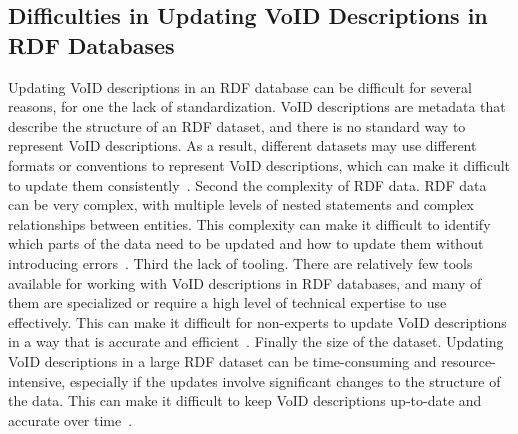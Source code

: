 \subsection{Difficulties in Updating VoID Descriptions in RDF Databases} \label{sec:difficulties-void}
Updating VoID descriptions in an RDF database can be difficult for several reasons, for one the lack of standardization. VoID descriptions are metadata that describe the structure of an RDF dataset, and there is no standard way to represent VoID descriptions. As a result, different datasets may use different formats or conventions to represent VoID descriptions, which can make it difficult to update them consistently~\cite{documentation-void}. Second the complexity of RDF data. RDF data can be very complex, with multiple levels of nested statements and complex relationships between entities. This complexity can make it difficult to identify which parts of the data need to be updated and how to update them without introducing errors~\cite{the-web-of-data}. Third the lack of tooling. There are relatively few tools available for working with VoID descriptions in RDF databases, and many of them are specialized or require a high level of technical expertise to use effectively. This can make it difficult for non-experts to update VoID descriptions in a way that is accurate and efficient~\cite{mendes2019voidext}. Finally the size of the dataset. Updating VoID descriptions in a large RDF dataset can be time-consuming and resource-intensive, especially if the updates involve significant changes to the structure of the data. This can make it difficult to keep VoID descriptions up-to-date and accurate over time~\cite{the-web-of-data}.
